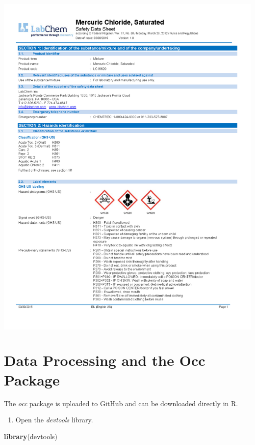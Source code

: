 \documentclass[]{book}
\newenvironment{Shaded}{\begin{snugshade}}{\end{snugshade}}
\newcommand{\KeywordTok}[1]{\textcolor[rgb]{0.13,0.29,0.53}{\textbf{#1}}}
\newcommand{\NormalTok}[1]{#1}
\providecommand{\tightlist}{%
  \setlength{\itemsep}{0pt}\setlength{\parskip}{0pt}}
\begin{document}
\includegraphics[width=1\textwidth,height=\textheight]{images/Saturated-Mercuric-Chloride-SDS_Page_1.png}

\hypertarget{data_processing}{%
\chapter{Data Processing and the Occ Package}\label{data_processing}}

The \emph{occ} package is uploaded to GitHub and can be downloaded directly in R.

\begin{enumerate}
\def\labelenumi{\arabic{enumi}.}
\tightlist
\item
  Open the \emph{devtools} library.
\end{enumerate}

\begin{Shaded}
\begin{Highlighting}[]
\KeywordTok{library}\NormalTok{(devtools)}
\end{Highlighting}
\end{Shaded}
\end{document}
